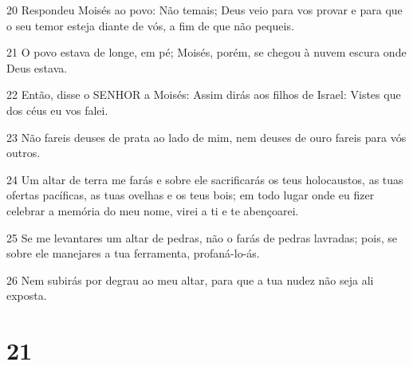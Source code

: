 \par 20 Respondeu Moisés ao povo: Não temais; Deus veio para vos provar e para que o seu temor esteja diante de vós, a fim de que não pequeis.
\par 21 O povo estava de longe, em pé; Moisés, porém, se chegou à nuvem escura onde Deus estava.
\par 22 Então, disse o SENHOR a Moisés: Assim dirás aos filhos de Israel: Vistes que dos céus eu vos falei.
\par 23 Não fareis deuses de prata ao lado de mim, nem deuses de ouro fareis para vós outros.
\par 24 Um altar de terra me farás e sobre ele sacrificarás os teus holocaustos, as tuas ofertas pacíficas, as tuas ovelhas e os teus bois; em todo lugar onde eu fizer celebrar a memória do meu nome, virei a ti e te abençoarei.
\par 25 Se me levantares um altar de pedras, não o farás de pedras lavradas; pois, se sobre ele manejares a tua ferramenta, profaná-lo-ás.
\par 26 Nem subirás por degrau ao meu altar, para que a tua nudez não seja ali exposta.

\chapter{21}

